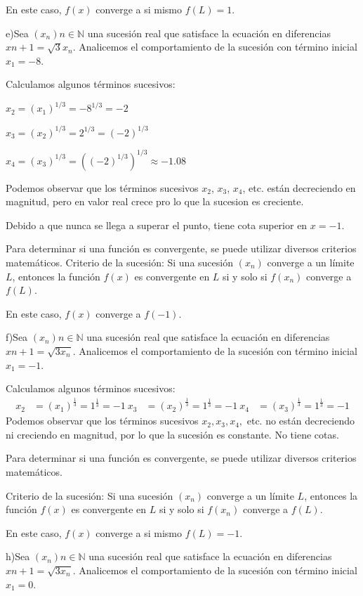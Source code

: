 \documentclass{article}
\begin{document}
En este caso, $f(x)$ converge a si mismo $f(L)= 1$.

e)Sea $(x_n){n \in \mathbb{N}}$ una sucesión real que satisface la ecuación en diferencias $x{n+1} = \sqrt{3}x_n$. Analicemos el comportamiento de la sucesión con término inicial $x_1 = -8$.

Calculamos algunos términos sucesivos:

$x_2 = (x_1)^{1/3} = -8^{1/3} = -2$

$x_3 = (x_2)^{1/3} = 2^{1/3} = (-2)^{1/3}$

$x_4 = (x_3)^{1/3} = ((-2)^{1/3})^{1/3} \approx -1.08$

Podemos observar que los términos sucesivos $x_2$, $x_3$, $x_4$, etc. están decreciendo en magnitud, pero en valor real crece pro lo que la sucesion es creciente.

Debido a que nunca se llega a superar el punto, tiene cota superior en $x = -1$.

Para determinar si una función es convergente, se puede utilizar diversos criterios matemáticos. Criterio de la sucesión: Si una sucesión $(x_n)$ converge a un límite $L$, entonces la función $f(x)$ es convergente en $L$ si y solo si $f(x_n)$ converge a $f(L)$.

En este caso, $f(x)$ converge a $f(-1)$.

f)Sea $(x_n){n \in \mathbb{N}}$ una sucesión real que satisface la ecuación en diferencias $x{n+1} = \sqrt{3x_n}$. Analicemos el comportamiento de la sucesión con término inicial $x_1 = -1$.

Calculamos algunos términos sucesivos:
\begin{align*}
x_2 &= (x_1)^{\frac{1}{3}} = 1^{\frac{1}{3}} = -1 \
x_3 &= (x_2)^{\frac{1}{3}} = 1^{\frac{1}{3}} = -1 \
x_4 &= (x_3)^{\frac{1}{3}} = 1^{\frac{1}{3}} = -1
\end{align*}
Podemos observar que los términos sucesivos $x_2, x_3, x_4,$ etc. no están decreciendo ni creciendo en magnitud, por lo que la sucesión es constante. No tiene cotas.

Para determinar si una función es convergente, se puede utilizar diversos criterios matemáticos.

Criterio de la sucesión: Si una sucesión $(x_n)$ converge a un límite $L$, entonces la función $f(x)$ es convergente en $L$ si y solo si $f(x_n)$ converge a $f(L)$.

En este caso, $f(x)$ converge a si mismo $f(L)= -1$.

h)Sea $(x_n){n \in \mathbb{N}}$ una sucesión real que satisface la ecuación en diferencias $x{n+1} = \sqrt{3x_n}$. Analicemos el comportamiento de la sucesión con término inicial $x_1 = 0$.
\end{document}
